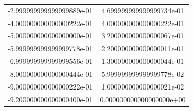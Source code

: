 \begin{table}
\begin{tabular}{S[round-precision = 1]|S[round-precision = 1]}
    -2.999999999999999889e-01 & 4.699999999999999734e-01\\
    -4.000000000000000222e-01 & 4.000000000000000222e-01\\
    -5.000000000000000000e-01 & 3.200000000000000067e-01\\
    -5.999999999999999778e-01 & 2.200000000000000011e-01\\
    -6.999999999999999556e-01 & 1.300000000000000044e-01\\
    -8.000000000000000444e-01 & 5.999999999999999778e-02\\
    -9.000000000000000222e-01 & 1.000000000000000021e-02\\
    -9.200000000000000400e-01 & 0.000000000000000000e+00\\
    \midrule
    \bottomrule
  \end{tabular}
\end{table}

